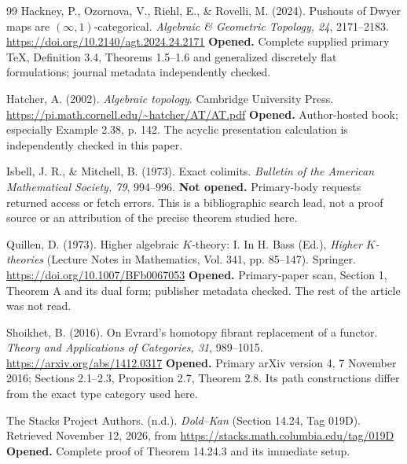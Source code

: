 \documentclass[11pt,a4paper]{article}
\theoremstyle{definition}
\theoremstyle{remark}
\begin{document}
\begin{thebibliography}{99}
Hackney, P., Ozornova, V., Riehl, E., \& Rovelli, M. (2024). Pushouts of Dwyer maps are $(\infty,1)$-categorical. \emph{Algebraic \& Geometric Topology, 24}, 2171--2183. \url{https://doi.org/10.2140/agt.2024.24.2171}
\newline\textbf{Opened.} Complete supplied primary TeX, Definition 3.4, Theorems 1.5--1.6 and generalized discretely flat formulations; journal metadata independently checked.

Hatcher, A. (2002). \emph{Algebraic topology}. Cambridge University Press. \url{https://pi.math.cornell.edu/~hatcher/AT/AT.pdf}
\newline\textbf{Opened.} Author-hosted book; especially Example 2.38, p. 142. The acyclic presentation calculation is independently checked in this paper.

Isbell, J. R., \& Mitchell, B. (1973). Exact colimits. \emph{Bulletin of the American Mathematical Society, 79}, 994--996.
\newline\textbf{Not opened.} Primary-body requests returned access or fetch errors. This is a bibliographic search lead, not a proof source or an attribution of the precise theorem studied here.


Quillen, D. (1973). Higher algebraic $K$-theory: I. In H. Bass (Ed.), \emph{Higher $K$-theories} (Lecture Notes in Mathematics, Vol. 341, pp. 85--147). Springer. \url{https://doi.org/10.1007/BFb0067053}
\newline\textbf{Opened.} Primary-paper scan, Section 1, Theorem A and its dual form; publisher metadata checked. The rest of the article was not read.

Shoikhet, B. (2016). On Evrard's homotopy fibrant replacement of a functor. \emph{Theory and Applications of Categories, 31}, 989--1015. \url{https://arxiv.org/abs/1412.0317}
\newline\textbf{Opened.} Primary arXiv version 4, 7 November 2016; Sections 2.1--2.3, Proposition 2.7, Theorem 2.8. Its path constructions differ from the exact type category used here.

The Stacks Project Authors. (n.d.). \emph{Dold--Kan} (Section 14.24, Tag 019D). Retrieved November 12, 2026, from \url{https://stacks.math.columbia.edu/tag/019D}
\newline\textbf{Opened.} Complete proof of Theorem 14.24.3 and its immediate setup.


\end{thebibliography}
\end{document}
